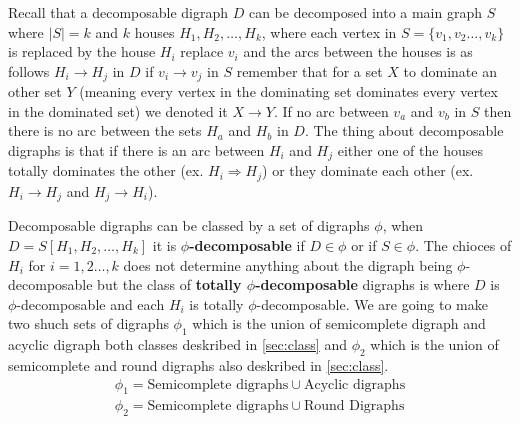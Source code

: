 Recall that a decomposable digraph $D$ can be decomposed into a main graph $S$ where $|S|=k$ and $k$ houses $H_1,H_2,\dots , H_k$, where each vertex in $S=\lbrace v_1,v_2\dots ,v_k\rbrace$ is replaced by the house $H_i$ replace $v_i$ and the arcs between the houses is as follows $H_i \rightarrow H_j$ in $D$ if $v_i\rightarrow v_j$ in $S$ remember that for a set $X$ to dominate an other set $Y$ (meaning every vertex in the dominating set dominates every vertex in the dominated set) we denoted it $X \rightarrow Y$. If no arc between $v_a$ and $v_b$ in $S$ then there is no arc between the sets $H_a$ and $H_b$ in $D$. 
The thing about decomposable digraphs is that if there is an arc between $H_i$ and $H_j$ either one of the houses totally dominates the other (ex. $H_i \Rightarrow H_j$) or they dominate each other (ex. $H_i \rightarrow H_j$ and $H_j\rightarrow H_i$).

Decomposable digraphs can be classed by a set of digraphs $\phi$, when \\
$D=S[H_1,H_2,\dots ,H_k]$ it is \textbf{$\phi$-decomposable} if $D\in \phi$ or if $S\in \phi$. The chioces of $H_i$ for $i=1,2\dots , k$ does not determine anything about the digraph being $\phi$-decomposable but the class of \textbf{totally $\phi$-decomposable} digraphs is where $D$ is $\phi$-decomposable and each $H_i$ is totally $\phi$-decomposable. 
We are going to make two shuch sets of digraphs $\phi_1$ which is the union of semicomplete digraph and acyclic digraph both classes deskribed in \autoref{sec:class} and $\phi_2$ which is the union of semicomplete and round digraphs also deskribed in \autoref{sec:class}.  
\begin{align}
    \phi_1=\text{Semicomplete digraphs}\cup \text{Acyclic digraphs}
    \label{eq:phi1}\\
    \phi_2=\text{Semicomplete digraphs}\cup \text{Round Digraphs}
    \label{eq:phi2}
\end{align}
